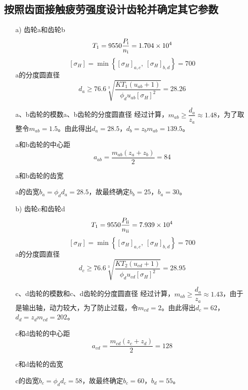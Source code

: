 \subsection{按照齿面接触疲劳强度设计齿轮并确定其它参数}
\begin{itemize}
	\item [a)]齿轮a和齿轮b
	$$T_1=9550\frac{P_{\mathrm{\uppercase\expandafter{\romannumeral1}}}}{n_\mathrm{\uppercase\expandafter{\romannumeral1}}}=1.704\times 10^4$$
	$$\left[\sigma_H\right]=\min\left\{\left[\sigma_H\right]_{a,c},~\left[\sigma_H\right]_{b,d}\right\}=700$$
	a的分度圆直径
	$$d_{a}\geq 76.6\sqrt[3]{\frac{KT_{1}\left(u_{ab}+1\right)}{\phi_{d}u_{ab}\left[\sigma_H\right]^2}}=28.26$$
	\par a、b齿轮的模数a、b齿轮的分度圆直径
	经过计算，$m_{ab}\geq \dfrac{d_a}{z_a}\approx 1.48$，为了取整令$m_{ab}=1.5$。由此得出$d_a=28.5$，$d_b=z_bm_{ab}=139.5$。
	\par a和b齿轮的中心距
	$$a_{ab}=\dfrac{m_{ab}\left(z_a+z_b\right)}{2}=84$$
	\par a和b齿轮的齿宽
	\par a的齿宽$b_a=\phi_{d}d_a=28.5$，故最终确定$b_b=25$，$b_a=30$。
	\item [b)]齿轮c和齿轮d
	$$T_1=9550\frac{P_{\mathrm{\uppercase\expandafter{\romannumeral2}}}}{n_\mathrm{\uppercase\expandafter{\romannumeral2}}}=7.939\times 10^4$$
	$$\left[\sigma_H\right]=\min\left\{\left[\sigma_H\right]_{a,c},~\left[\sigma_H\right]_{b,d}\right\}=700$$
	a的分度圆直径
	$$d_{c}\geq 76.6\sqrt[3]{\frac{KT_{2}\left(u_{cd}+1\right)}{\phi_{d}u_{cd}\left[\sigma_H\right]^2}}=28.95$$
	\par c、d齿轮的模数和c、d齿轮的分度圆直径
	经过计算，$m_{ab}\geq \dfrac{d_a}{z_a}\approx 1.43$，由于是输出轴，动力较大，为了防止过载，令$m_{cd}=2$。由此得出$d_c=62$，$d_d=z_dm_{cd}=202$。
	\par c和d齿轮的中心距
	$$a_{cd}=\dfrac{m_{cd}\left(z_c+z_d\right)}{2}=128$$
	\par c和d齿轮的齿宽
	\par c的齿宽$b_c=\phi_{d}d_c=58$，故最终确定$b_c=60$，$b_d=55$。
\end{itemize}
